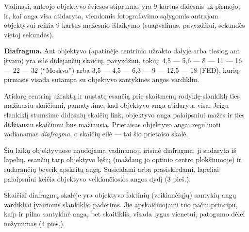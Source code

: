 \documentclass[12pt]{book}
\begin{document}
					Vadinasi, antrojo objektyvo šviesos stiprumas yra 9 kartus didesnis už pirmojo, ir, kai anga visa atidaryta, viendomis fotografavimo sąlygomis antrajam objektyvui reikia 9 kartus mažesnio išlaikymo (suapvalinus, pavyzdžiui,  sekundės vietoj  sekundės).

					\textbf{Diafragma.} Ant objektyvo (apatinėje centrinio užrakto dalyje arba tiesiog ant įtvaro) yra eilė didėjančių skaičių, pavyzdžiui, tokių: 4,5 --- 5,6 --- 8 --- 11 --- 16 --- 22 --- 32 (``Moskva'') arba 3,5 --- 4,5 --- 6,3 --- 9 --- 12,5 --- 18 (FED), kurių pirmasis visada sutampa su objektyvo santykinės angos vardikliu.

					Atidarę centrinį užraktą ir nustatę esančią prie skaitmenų rodyklę-slankiklį ties mažiausiu skaičiumi, pamatysime, kad objektyvo anga atidaryta visa. Jeigu slankiklį stumsime didesnių skaičių link, objektyvo anga palaipsniui mažės ir ties didžiausiu skaičiumi bus mažiausia. Prietaisas objektyvo angai reguliuoti vadianamas \textit{diafragma}, o skaičių eilė --- tai šio prietaiso skalė.

					Šių laikų objektyvuose naudojama vadinamoji irisinė diafragma; ji sudaryta iš lapelių, esančių tarp objektyvo lęšių (maždaug jo optinio centro plokštumoje) ir sudarančių beveik apskritą angą. Susieidami arba prasiskirdami, lapeliai palaipsniui keičia objektyvo veikiančiosios angos dydį (3 pieš.).

					Skaičiai diafragmų skalėje yra objektyvo faktinių (veikiančiųjų) santykių angų vardikliai įvairioms slankiklio padėtims. Jie apskaičiuojami tuo pačiu principu, kaip ir pilna santykinė anga, bet skaitiklis, visada lygus vienetui, patogumo dėlei nežymimas (4 pieš.).
\end{document}
